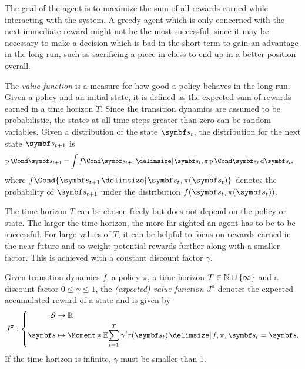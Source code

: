 The goal of the agent is to maximize the sum of all rewards earned while interacting with the system.
A greedy agent which is only concerned with the next immediate reward might not be the most successful, since it may be necessary to make a decision which is bad in the short term to gain an advantage in the long run, such as sacrificing a piece in chess to end up in a better position overall.

The \emph{value function} is a measure for how good a policy behaves in the long run.
Given a policy and an initial state, it is defined as the expected sum of rewards earned in a time horizon $T$.
Since the transition dynamics are assumed to be probabilistic, the states at all time steps greater than zero can be random variables.
Given a distribution of the state $\mat{s_t}$, the distribution for the next state $\mat{s_{t+1}}$ is
\begin{align}
    \Prob{\mat{s_{t+1}}} & = \int \Fun{f}{\mat{s_{t+1}} \given \mat{s_t}, \pi}\Prob{\mat{s_t}} \diff \mat{s_t},
\end{align}
where $f\Cond{\mat{s_{t+1}} \given \mat{s_t}, \pi(\mat{s_t})}$ denotes the probability of $\mat{s_{t+1}}$ under the distribution $f(\mat{s_t}, \pi(\mat{s_t}))$.

The time horizon $T$ can be chosen freely but does not depend on the policy or state.
The larger the time horizon, the more far-sighted an agent has to be to be successful.
For large values of $T$, it can be helpful to focus on rewards earned in the near future and to weight potential rewards further along with a smaller factor.
This is achieved with a constant discount factor $\gamma$.
\begin{definition}
    \label{def:bayesian_rl:old_value_function}
    Given transition dynamics $f$, a policy $\pi$, a time horizon $T \in \mathbb{N} \cup \left\{ \infty \right\}$ and a discount factor $0 \leq \gamma \leq 1$, the \emph{(expected) value function $J^\pi$} denotes the expected accumulated reward of a state and is given by
    \begin{align}
        J^\pi : \left\{
        \begin{aligned}
            \Sc     & \to \Rb                                                                                      \\
            \mat{s} & \mapsto \Moment*{\E}{\sum_{t=1}^T \gamma^t r(\mat{s}_t) \given f, \pi, \mat{s}_t = \mat{s}}.
        \end{aligned}
        \right.
    \end{align}
    If the time horizon is infinite, $\gamma$ must be smaller than 1.
\end{definition}

